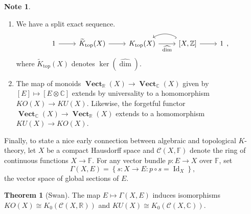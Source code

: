 \documentclass[10pt,letterpaper,cm]{nupset}
\theoremstyle{definition}
\newtheorem{note}[definition]{Note}
\theoremstyle{theorem}
\newtheorem{theorem}[definition]{Theorem}
\theoremstyle{remark}
\newcommand{\C}{\mathbb C}
\newcommand{\F}{\mathbb F}
\newcommand{\R}{\mathbb R}
\newcommand{\1}{\mathbf{1}}
\newcommand{\0}{\vec 0}
\DeclareMathOperator{\id}{Id}
\DeclareMathOperator{\vect}{\mathbf{Vect}}
\DeclareMathOperator{\topp}{\mathrm{top}}
\begin{document}
\begin{note} $ $
\begin{enumerate}
\item We have a split exact sequence. 
\[
\begin{tikzcd}
1 \arrow[r] & \widetilde{K}_{\topp}(X) \arrow[r] & K_{\topp}(X) \arrow[r, "\widehat{\dim}"'] & {[X, \mathbb Z]} \arrow[r] \arrow[l, hook, bend right] & 1
\end{tikzcd},
\] where $\widetilde{K}_{\topp}(X)$ denotes $\ker\left(\widehat{\dim}\right)$.
\item The map of monoids $\vect_{\R}(X) \to \vect_{\C}(X)$ given by $\left[E\right] \mapsto \left[E \otimes \C\right]$ extends by universality to a homomorphism $KO(X) \to KU(X)$. Likewise, the forgetful functor $\vect_{\C}(X) \to \vect_{\R}(X)$ extends to a homomorphism $KU(X) \to KO(X)$.
\end{enumerate}
\end{note}

\medskip

Finally, to state a nice early connection between algebraic and topological $K$-theory, let $X$ be a compact Hausdorff space and $\mathcal C(X, \F)$ denote the ring of continuous functions $X \to \F$. For any vector bundle $p: E \to X$ over $\F$, set $$\Gamma(X, E) = \left\{s: X \to E : p \circ s = \id_X\right\},$$ the vector space of global sections of $E$.

\begin{theorem}[Swan]\label{swan}
The map $E \mapsto \Gamma(X, E)$ induces isomorphisms $KO(X) \cong K_0(\mathcal C(X, \R))$ and $KU(X) \cong K_0( \mathcal C(X, \C))$.
\end{theorem}
\end{document}
